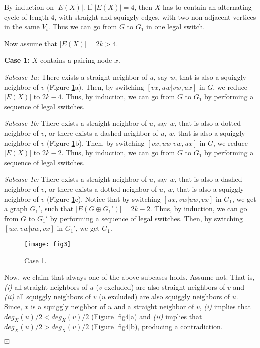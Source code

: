 \documentclass[12pt,a4paper]{article}
\theoremstyle{definition}
\theoremstyle{plain}
\newenvironment{prf}{\noindent {\bf Proof.}}{\begin{flushright}\vspace{-2em}\footnotesize$\boxdot$\normalsize\end{flushright}\smallskip}
\begin{document}
\begin{prf}
By induction on $|E(X)|$. If $|E(X)|=4$, then $X$ has to contain an alternating 
cycle of length 4, with straight and squiggly edges, with two non adjacent vertices 
in the same $V_i$. Thus we can go from $G$ to $G_1$ in one legal switch.

Now assume that $|E(X)|= 2k>4$. 

\noindent\textbf{Case 1:} $X$ contains a pairing node $x$.

\noindent\emph{Subcase 1a:} There exists a straight neighbor of $u$, say $w$, that 
is also a squiggly neighbor of $v$ (Figure \ref{fig3}a). Then, by switching $[vx,uw|vw,ux]$ in $G$, 
we reduce $|E(X)|$ to $2k-4$. Thus, by induction, we can go from $G$ to $G_1$ by 
performing a sequence of legal switches.

\noindent\emph{Subcase 1b:} There exists a straight neighbor of $u$, say $w$, that 
is also a dotted neighbor of $v$, or there exists a dashed neighbor of $u$, $w$, that 
is also a squiggly neighbor of $v$ (Figure \ref{fig3}b). Then, by switching $[vx,uw|vw,ux]$ in $G$, 
we reduce $|E(X)|$ to $2k-2$. Thus, by induction, we can go from $G$ to $G_1$ by 
performing a sequence of legal switches.

\noindent\emph{Subcase 1c:} There exists a straight neighbor of $u$, say $w$, that 
is also a dashed neighbor of $v$, or there exists a dotted neighbor of $u$, $w$, that 
is also a squiggly neighbor of $v$ (Figure \ref{fig3}c). Notice that by switching $[ux,vw|uw,vx]$ 
in $G_1$, we get a graph $G_1'$, such that $|E(G\oplus G_1')|=2k-2$. Thus, by induction, 
we can go from $G$ to $G_1'$ by performing a sequence of legal switches. Then, by 
switching $[ux,vw|uw,vx]$ in $G_1'$, we get $G_1$.

\begin{figure}[h]
\centering
\texttt{[image: fig3]}
\caption{Case 1.}
\label{fig3}
\end{figure}

Now, we claim that always one of the above subcases holds. Assume not. That is, \emph{(i)} 
all straight neighbors of $u$ ($v$ excluded) are also straight neighbors of $v$ and 
\emph{(ii)} all squiggly neighbors of $v$ ($u$ excluded) are also squiggly neighbors 
of $u$. Since, $x$ is a squiggly neighbor of $u$ and a straight neighbor of $v$,
\emph{(i)} implies that $deg_X(u)/2<deg_X(v)/2$ (Figure \ref{fig4}a) and \emph{(ii)} implies 
that $deg_X(u)/2>deg_X(v)/2$ (Figure \ref{fig4}b), producing a contradiction.\medskip


\end{prf}
\end{document}
